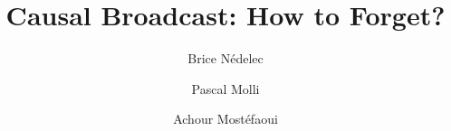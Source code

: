 \documentclass[english,a4paper]{lipics-v2018}
\author{Brice N{\'e}delec}{\affLSNN}{brice.nedelec@ls2n.fr}{}{}
\author{Pascal Molli}{\affLSNN}{pascal.molli@ls2n.fr}{}{}
\author{Achour Most{\'e}faoui}{\affLSNN}{achour.mostefaoui@ls2n.fr}{}{}
\begin{document}
 

\title{Causal Broadcast: How to Forget?}

\maketitle











  
\end{document}
